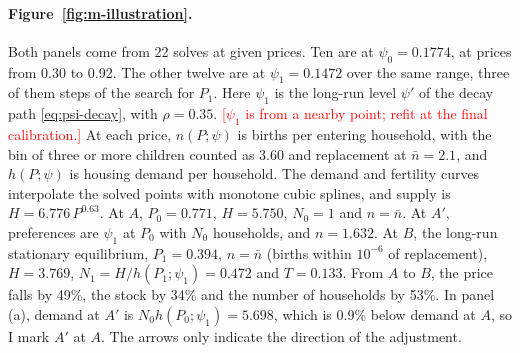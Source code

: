 \paragraph{Figure~\ref{fig:m-illustration}.} Both panels come from 22 solves at
given prices. Ten are at $\psi_0=0.1774$, at prices from 0.30 to 0.92. The
other twelve are at $\psi_1=0.1472$ over the same range, three of them steps
of the search for $P_1$. Here $\psi_1$ is the long-run level $\psi'$ of the
decay path \eqref{eq:psi-decay}, with $\rho=0.35$.
\textcolor{red}{[$\psi_1$ is from a nearby point; refit at the final
calibration.]} At each price, $n(P;\psi)$ is births per entering household,
with the bin of three or more children counted as 3.60 and replacement at
$\bar n=2.1$, and $h(P;\psi)$ is housing demand per household. The demand and
fertility curves interpolate the solved points with monotone cubic splines,
and supply is $H=6.776\,P^{0.63}$. At $A$, $P_0=0.771$, $H=5.750$, $N_0=1$
and $n=\bar n$. At $A'$, preferences are $\psi_1$ at $P_0$ with $N_0$
households, and $n=1.632$. At $B$, the long-run stationary equilibrium,
$P_1=0.394$, $n=\bar n$ (births within $10^{-6}$ of replacement), $H=3.769$,
$N_1=H/h(P_1;\psi_1)=0.472$ and $T=0.133$. From $A$ to $B$, the price falls by
49\%, the stock by 34\% and the number of households by 53\%. In panel (a),
demand at $A'$ is $N_0h(P_0;\psi_1)=5.698$, which is 0.9\% below demand at
$A$, so I mark $A'$ at $A$. The arrows only indicate the direction of the
adjustment.
